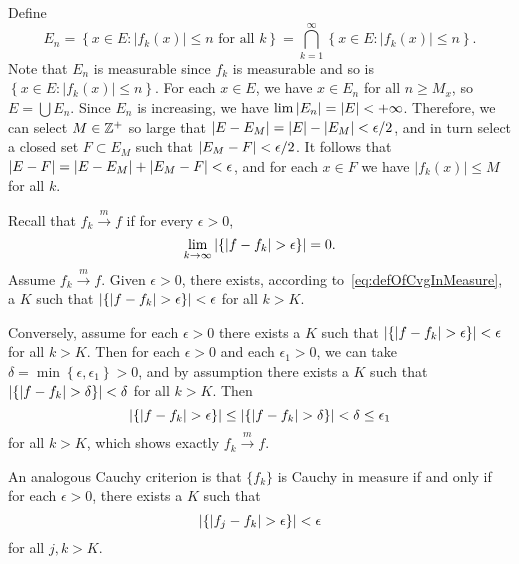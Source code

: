 \begin{exercise}{4.15}
  Define
  \[
    E_n = \left\{ x \in E : \lvert f_k(x) \rvert \le n
    \text{ for all $k$} \right\}
    = \bigcap_{k=1}^{\infty}
    \left\{ x \in E : \lvert f_k(x) \rvert \le n \right\}.
  \]
  Note that $E_n$ is measurable
  since $f_k$ is measurable
  and so is $\left\{ x \in E : \lvert f_k(x) \rvert \le n \right\}$.
  For each $x \in E$,
  we have $x \in E_n$ for all $n \ge M_x$,
  so $E = \bigcup E_n$.
  Since $E_n$ is increasing,
  we have $\lim \left\vert E_n\right\vert = \left\vert E\right\vert < +\infty$.
  Therefore, we can select $M \in \mathbb{Z}^+$ so large that
  $\left\vert E - E_M\right\vert = \left\vert E\right\vert - \left\vert E_M\right\vert < \epsilon/2$,
  and in turn select a closed set $F \subset E_M$ such that
  $\left\vert E_M - F\right\vert < \epsilon/2$.
  It follows that $\left\vert E - F\right\vert = \left\vert E - E_M\right\vert + \left\vert E_M - F\right\vert < \epsilon$,
  and for each $x \in F$ we have
  $\lvert f_k(x) \rvert \le M$ for all $k$.
\end{exercise}

\begin{exercise}{4.16}
  Recall that $f_k \xrightarrow{m} f$ if for every $\epsilon > 0$,
  \begin{equation}
    \lim_{k \rightarrow \infty} \left\vert\left\{ \lvert f - f_k \rvert > \epsilon \right\}\right\vert = 0.
    \label{eq:defOfCvgInMeasure}
  \end{equation}
  Assume $f_k \xrightarrow{m} f$.
  Given $\epsilon > 0$,
  there exists, according to~\eqref{eq:defOfCvgInMeasure}, a $K$ such that
  $\left\vert\left\{ \lvert f - f_k \rvert > \epsilon \right\}\right\vert < \epsilon$
  for all $k > K$.

  Conversely, assume for each $\epsilon > 0$ there exists a $K$ such that
  $\left\vert\left\{ \lvert f - f_k \rvert > \epsilon \right\}\right\vert < \epsilon$
  for all $k > K$.
  Then for each $\epsilon > 0$ and each $\epsilon_1 > 0$,
  we can take $\delta = \min \left\{ \epsilon, \epsilon_1 \right\} > 0$,
  and by assumption there exists a $K$ such that
  $\left\vert\left\{ \lvert f - f_k \rvert > \delta \right\}\right\vert < \delta$
  for all $k > K$.
  Then
  \[
    \left\vert\left\{ \lvert f - f_k \rvert > \epsilon \right\}\right\vert
    \le \left\vert\left\{ \lvert f - f_k \rvert > \delta \right\}\right\vert
    < \delta \le \epsilon_1
  \]
  for all $k > K$, which shows exactly $f_k \xrightarrow{m} f$.

  An analogous Cauchy criterion is that
  $\{f_k\}$ is Cauchy in measure if and only if
  for each $\epsilon > 0$,
  there exists a $K$ such that
  \[
    \left\vert\left\{ \lvert f_j - f_k \rvert > \epsilon \right\}\right\vert < \epsilon
  \]
  for all $j, k > K$.
\end{exercise}

